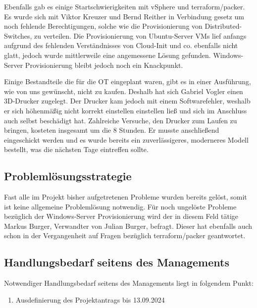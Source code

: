 \documentclass[
	headings=optiontotocandhead,%
	oneside,
	numbers=noenddot,%
	toc=flat, %
	10pt, %
	parskip=full, %
	listof=totoc, %
	listof=flat, %
	numbers=noenddot, %
	bibliography=totoc, %
	a4paper,DIV=14,
]{scrartcl}
\begin{document}
Ebenfalls gab es einige Startschwierigkeiten mit vSphere und terraform/packer. Es wurde sich mit Viktor Kreuzer und Bernd Reither in Verbindung gesetz um noch fehlende Berechtigungen, solche wie die Provisionierung von Distributed-Switches, zu verteilen. Die Provisionierung von Ubuntu-Server VMs lief anfangs aufgrund des fehlenden Verständnisses von Cloud-Init und co. ebenfalls nicht glatt, jedoch wurde mittlerweile eine angemessene Lösung gefunden. Windows-Server Provisionierung bleibt jedoch noch ein Knackpunkt.

Einige Bestandteile die für die OT eingeplant waren, gibt es in einer Ausführung, wie von uns gewünscht, nicht zu kaufen. Deshalb hat sich  Gabriel Vogler einen 3D-Drucker zugelegt. Der Drucker kam jedoch mit einem Softwarefehler, weshalb er sich höhenmäßig nicht korrekt einstellen einstellen ließ und sich im Anschluss auch selbst beschädigt hat. Zahlreiche Versuche, den Drucker zum Laufen zu bringen, kosteten insgesamt um die 8 Stunden. Er musste anschließend eingeschickt werden und es wurde bereits ein zuverlässigeres, moderneres Modell bestellt, was die nächsten Tage eintreffen sollte.

\subsection{Problemlösungsstrategie}
Fast alle im Projekt bisher aufgetretenen Probleme wurden bereits gelöst, somit ist keine allgemeine Problemlösung notwendig. Für noch ungelöste Probleme bezüglich der Windows-Server Provisionierung wird der in diesem Feld tätige Markus Burger, Verwandter von Julian Burger, befragt. Dieser hat ebenfalls auch schon in der Vergangenheit auf Fragen bezüglich terraform/packer geantwortet.

\subsection{Handlungsbedarf seitens des Managements}
Notwendiger Handlungsbedarf seitens des Managements liegt in folgendem Punkt:

\begin{enumerate}
	\item Ausdefinierung des Projektantrags bis 13.09.2024
\end{enumerate}
\end{document}
